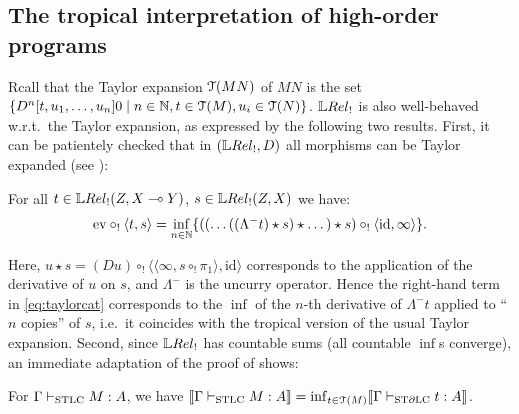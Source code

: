 \subsection{The tropical interpretation of high-order programs}\label{subsec:tro_int}

Rcall that the Taylor expansion $\mathcal{T}(MN)$ of $MN$ is the set $\set{\Der^{n}[t,u_1,\dots,u_n]0 \mid n\in\N,t\in\Te{M},u_i\in\Te{N}}$.
$\LREL_!$ is also well-behaved w.r.t.\ the Taylor expansion, as expressed by the following two results.
First, it can be patientely checked that in $(\LREL_!,D)$ all morphisms can be Taylor expanded  (see \cite[Definition 4.22]{Manzo2012}):

\begin{theorem}\label{thm:modelsTaylor}
 For all $t\in\HOM{\LREL_!}{Z}{X\multimap Y}$, $s\in\HOM{\LREL_!}{Z}{X}$ we have:%
 \begin{align}\label{eq:taylorcat}
  \mathrm{ev}\circ_!\langle t,s\rangle =
  \inf\limits_{n\in\mathbb{N}}
  \{((\dots((\Lambda^- t)\star s)\star \dots)\star s)\circ_! \langle \mathrm{id},\infty \rangle\}.
 \end{align} 
\end{theorem}
Here,
$u\star s= (Du)\circ_{!} \langle \langle  \infty, s\circ_{!} \pi_{1}\rangle,\mathrm{id}\rangle$ corresponds to the application of the derivative of $u$ on $s$, and $\Lambda^-$ is the uncurry operator.
Hence the right-hand term in \eqref{eq:taylorcat} corresponds to the $\inf$ of the $n$-th derivative of $\Lambda^{-}t$ applied to ``$n$ copies'' of $s$,  i.e.~it coincides with the tropical %
version of the usual Taylor expansion.
Second, since $\LREL_!$ has countable sums (all countable $\inf$s converge), an immediate adaptation of the proof of \cite[Theorem 4.23]{Manzo2012} shows:

\begin{corollary}\label{cor:T(M)=M}
 For $\Gamma\vdash_{\mathrm{STLC}} M:A$, we have %
$\llbracket\Gamma\vdash_{\mathrm{STLC}} M:A\rrbracket=\inf_{t\in\mathcal{T}(M)} \llbracket\Gamma\vdash_{\mathrm{ST}\partial\mathrm{LC}} t:A\rrbracket$. %
\end{corollary}

